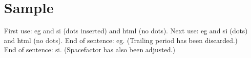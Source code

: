 \documentclass{report}
\begin{document}
\tableofcontents
\section{Sample}
First use: \gls{eg} and \gls{si} (dots inserted) and
\gls{html} (no dots).
Next use: \gls{eg} and \gls{si} (dots) and \gls{html} (no dots).
End of sentence: \gls{eg}. (Trailing period has been discarded.)
End of sentence: \gls{si}. (Spacefactor has also been adjusted.)
\printglossaries
\end{document}
